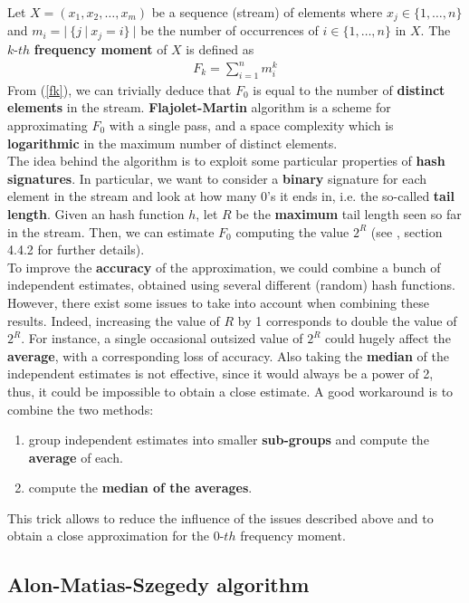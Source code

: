 Let $X = (x_1, x_2, \ldots, x_m)$ be a sequence (stream) of elements where $x_j \in \{1,\ldots,n\}$ and $m_i = |\ \{j \ | \ x_j = i\}\ |$ be the number of occurrences of $i \in \{1,\ldots,n\}$ in $X$.
The $k\text{-}th$ \textbf{frequency moment} of $X$ is defined as
\begin{align}
	F_k = \sum_{i = 1}^{n} m_{i}^k \label{fk}
\end{align}
From (\ref{fk}), we can trivially deduce that $F_0$ is equal to the number of \textbf{distinct elements} in the stream. \textbf{Flajolet-Martin}\cite{fm} algorithm is a scheme for approximating $F_0$ with a single pass, and a space complexity which is \textbf{logarithmic} in the maximum number of distinct elements.\\
The idea behind the algorithm is to exploit some particular properties of \textbf{hash signatures}. In particular, we want to consider a \textbf{binary} signature for each element in the stream and look at how many 0's it ends in, i.e. the so-called \textbf{tail length}. Given an hash function $h$, let $R$ be the \textbf{maximum} tail length seen so far in the stream. Then, we can estimate $F_0$ computing the value $2^R$ (see \cite{mmd}, section 4.4.2 for further details).\\
To improve the \textbf{accuracy} of the approximation, we could combine a bunch of independent estimates, obtained using several different (random) hash functions. However, there exist some issues to take into account when combining these results. Indeed, increasing the value of $R$ by 1 corresponds to double the value of $2^R$. For instance, a single occasional outsized value of $2^R$ could hugely affect the \textbf{average}, with a corresponding loss of accuracy. Also taking the \textbf{median} of the independent estimates is not effective, since it would always be a power of 2, thus, it could be impossible to obtain a close estimate. A good workaround is to combine the two methods:
\begin{enumerate}
	\item group independent estimates into smaller \textbf{sub-groups} and compute the \textbf{average} of each.
	
	\item compute the \textbf{median of the averages}.
\end{enumerate}
This trick allows to reduce the influence of the issues described above and to obtain a close approximation for the $0\text{-}th$ frequency moment.


\subsection{Alon-Matias-Szegedy algorithm}

